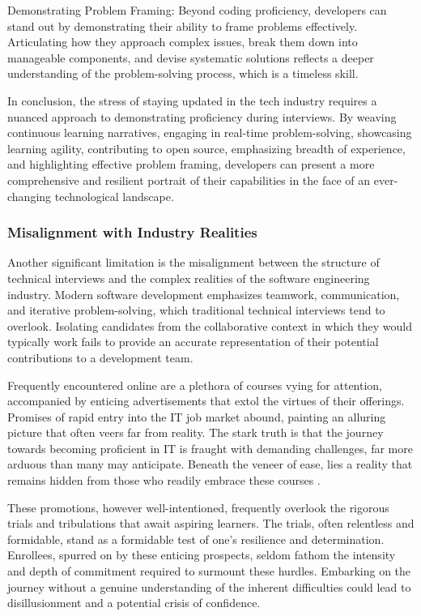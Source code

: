 \documentclass[
    a4paper, %
    10pt, %
    unnumberedsections, %
    twoside, %
]{LTJournalArticle}
\begin{document}
Demonstrating Problem Framing:
Beyond coding proficiency, developers can stand out by demonstrating their ability to frame problems effectively. Articulating how they approach complex issues, break them down into manageable components, and devise systematic solutions reflects a deeper understanding of the problem-solving process, which is a timeless skill.

In conclusion, the stress of staying updated in the tech industry requires a nuanced approach to demonstrating proficiency during interviews. By weaving continuous learning narratives, engaging in real-time problem-solving, showcasing learning agility, contributing to open source, emphasizing breadth of experience, and highlighting effective problem framing, developers can present a more comprehensive and resilient portrait of their capabilities in the face of an ever-changing technological landscape.





\subsubsection*{Misalignment with Industry Realities}

Another significant limitation is the misalignment between the structure of technical interviews and the complex realities of the software engineering industry. Modern software development emphasizes teamwork, communication, and iterative problem-solving, which traditional technical interviews tend to overlook. Isolating candidates from the collaborative context in which they would typically work fails to provide an accurate representation of their potential contributions to a development team.


Frequently encountered online are a plethora of courses vying for attention, accompanied by enticing advertisements that extol the virtues of their offerings. Promises of rapid entry into the IT job market abound, painting an alluring picture that often veers far from reality. The stark truth is that the journey towards becoming proficient in IT is fraught with demanding challenges, far more arduous than many may anticipate. Beneath the veneer of ease, lies a reality that remains hidden from those who readily embrace these courses \cite{dweck2006mindset,duckworth2016grit}.

These promotions, however well-intentioned, frequently overlook the rigorous trials and tribulations that await aspiring learners. The trials, often relentless and formidable, stand as a formidable test of one’s resilience and determination. Enrollees, spurred on by these enticing prospects, seldom fathom the intensity and depth of commitment required to surmount these hurdles. Embarking on the journey without a genuine understanding of the inherent difficulties could lead to disillusionment and a potential crisis of confidence.
\end{document}
